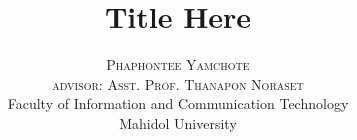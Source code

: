 \documentclass[a4paper,11pt]{extarticle}
\title{Title Here} %
\author{%
	\textsc{Phaphontee Yamchote} \\
	\textsc{advisor: Asst. Prof. Thanapon Noraset} \\
	{\small Faculty of Information and Communication Technology}\\{\small Mahidol University}\\[1ex]
}
\date{} %
\theoremstyle{definition}
\theoremstyle{definition}
\begin{document}
	\graphicspath{ {figure/} }
	\maketitle
	
	
	
%	
%	
%	
%	
%	
	 
	 
%	
\end{document}
